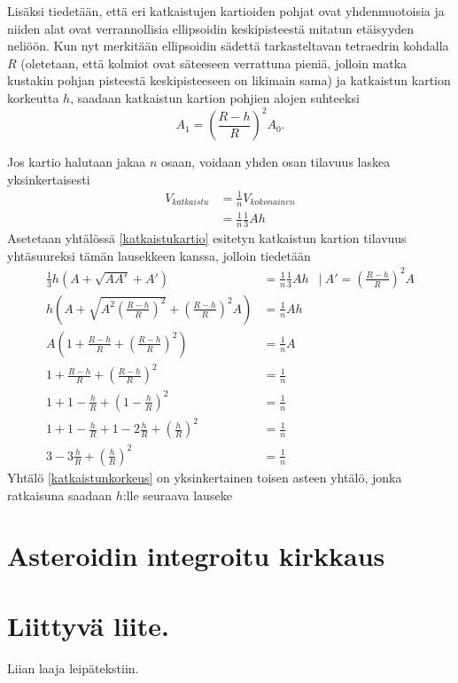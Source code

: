 \documentclass[12pt,a4paper,titlepage]{article}
\begin{document}
Lisäksi tiedetään, että eri katkaistujen kartioiden pohjat ovat yhdenmuotoisia ja niiden alat ovat verrannollisia ellipsoidin keskipisteestä mitatun etäisyyden neliöön. Kun nyt merkitään ellipsoidin sädettä tarkasteltavan tetraedrin kohdalla $R$ (oletetaan, että kolmiot ovat säteeseen verrattuna pieniä, jolloin matka kustakin pohjan pisteestä keskipisteeseen on likimain sama) ja katkaistun kartion korkeutta $h$, saadaan katkaistun kartion pohjien alojen suhteeksi
\begin{equation*}
	A_1=\left(\frac{R-h}{R}\right)^2A_0.
\end{equation*}

Jos kartio halutaan jakaa $n$ osaan, voidaan yhden osan tilavuus laskea yksinkertaisesti
\begin{align}
	V_{katkaistu} &= \frac{1}{n}V_{kokonainen}\nonumber\\
	&= \frac{1}{n}\frac{1}{3}Ah \nonumber
\end{align}
Asetetaan yhtälössä \ref{katkaistukartio} esitetyn katkaistun kartion tilavuus yhtäsuureksi tämän lausekkeen kanssa, jolloin tiedetään
\begin{align}\label{katkaistunkorkeus}
	\frac{1}{3} h (A + \sqrt {AA'} + A') &= \frac{1}{n}\frac{1}{3}Ah &\bigg\vert~ A'=\left(\frac{R-h}{R}\right)^2A \nonumber\\
	h \left(A + \sqrt {A^2\left(\frac{R-h}{R}\right)^2} + \left(\frac{R-h}{R}\right)^2A\right) &= \frac{1}{n}Ah & \nonumber\\
	A\left(1 + \frac{R-h}{R} + \left(\frac{R-h}{R}\right)^2\right) &= \frac{1}{n}A &\nonumber\\
	1 + \frac{R-h}{R} + \left(\frac{R-h}{R}\right)^2 &= \frac{1}{n} &\nonumber\\
	1 + 1-\frac{h}{R} + \left(1-\frac{h}{R}\right)^2 &= \frac{1}{n} &\nonumber\\
	1 + 1-\frac{h}{R} + 1-2\frac{h}{R}+\left(\frac{h}{R}\right)^2 &= \frac{1}{n} &\nonumber\\
	3 - 3\frac{h}{R} +\left(\frac{h}{R}\right)^2 &= \frac{1}{n} &
\end{align}
Yhtälö \ref{katkaistunkorkeus} on yksinkertainen toisen asteen yhtälö, jonka ratkaisuna saadaan $h$:lle seuraava lauseke
	
\section{Asteroidin integroitu kirkkaus}





\appendix
\newpage
\section{Liittyvä liite.} \label{koodi}
Liian laaja leipätekstiin.
\end{document}
